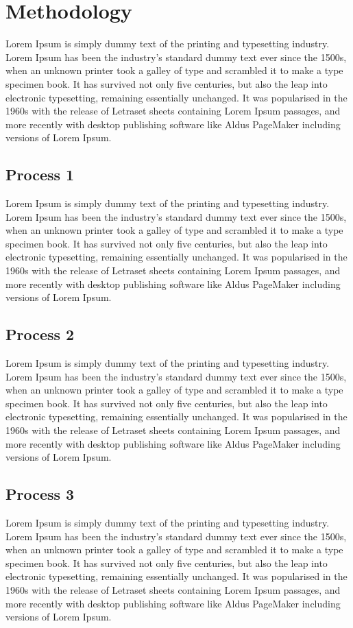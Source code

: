\newpage
\section{Methodology}
\label{Methodology}
Lorem Ipsum is simply dummy text of the printing and typesetting industry. Lorem Ipsum has been the industry's standard dummy text ever since the 1500s, when an unknown printer took a galley of type and scrambled it to make a type specimen book. It has survived not only five centuries, but also the leap into electronic typesetting, remaining essentially unchanged. It was popularised in the 1960s with the release of Letraset sheets containing Lorem Ipsum passages, and more recently with desktop publishing software like Aldus PageMaker including versions of Lorem Ipsum.

\subsection{Process 1}
Lorem Ipsum\cite{DUMMY:1} is simply dummy text of the printing and typesetting industry. Lorem Ipsum has been the industry's standard dummy text ever since the 1500s, when an unknown printer took a galley of type and scrambled it to make a type specimen book. It has survived not only five centuries, but also the leap into electronic typesetting, remaining essentially unchanged. It was popularised in the 1960s with the release of Letraset sheets containing Lorem Ipsum passages, and more recently with desktop publishing software like Aldus PageMaker including versions of Lorem Ipsum.

\subsection{Process 2}
Lorem Ipsum\cite{DUMMY:1} is simply dummy text of the printing and typesetting industry. Lorem Ipsum has been the industry's standard dummy text ever since the 1500s, when an unknown printer took a galley of type and scrambled it to make a type specimen book. It has survived not only five centuries, but also the leap into electronic typesetting, remaining essentially unchanged. It was popularised in the 1960s with the release of Letraset sheets containing Lorem Ipsum passages, and more recently with desktop publishing software like Aldus PageMaker including versions of Lorem Ipsum.

\subsection{Process 3}
Lorem Ipsum\cite{DUMMY:1} is simply dummy text of the printing and typesetting industry. Lorem Ipsum has been the industry's standard dummy text ever since the 1500s, when an unknown printer took a galley of type and scrambled it to make a type specimen book. It has survived not only five centuries, but also the leap into electronic typesetting, remaining essentially unchanged. It was popularised in the 1960s with the release of Letraset sheets containing Lorem Ipsum passages, and more recently with desktop publishing software like Aldus PageMaker including versions of Lorem Ipsum.

